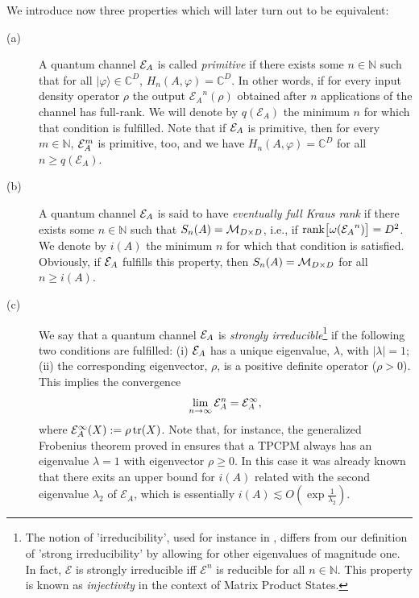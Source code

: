 \documentclass[journal,twoside]{IEEEtran}
\newcommand{\1}{\mathbbm{1}}
\def\E{{\cal E}}
\renewcommand{\>}{\rangle}
\newcommand{\<}{\langle}
\def\C{\mathbb{C}}
\def\E{\mathcal{E}}
\def\MDD{{\cal M}_{D\times D}}
\def\N{\mathbb N}
\begin{document}
We introduce now three properties which will later turn out to be
equivalent:
\begin{description}
  \item[(a)] A quantum channel  ${\cal E}_A$ is called {\em primitive} if
there exists some $n\in \N$ such that for all
$|\varphi\rangle\in \C^D$, $H_n(A,\varphi)=\C^D$. In other
words, if for every input density operator $\rho$ the output
${\E_A}^n(\rho)$ obtained after $n$ applications of the channel
has full-rank. We will denote by $q(\E_A)$ the minimum $n$ for
which that condition is fulfilled. Note that if ${\cal E}_A$ is
primitive, then for every $m\in\mathbb{N}$, ${\cal E}_A^m$ is
primitive, too, and  we have $H_n(A,\varphi)=\C^D$ for all $n\ge
q(\E_A)$.
  \item[(b)] A quantum channel ${\cal E}_A$ is said to have \emph{eventually
full Kraus rank} if there exists some $n\in \N$ such that
$S_n(A)=\MDD$, i.e., if ${\rm
rank}\big[\omega({\E_A}^n)\big]=D^2$. We denote by $i(A)$ the
minimum $n$ for which that condition is satisfied. Obviously, if
${\cal E}_A$ fulfills this property, then $S_n(A)=\MDD$ for all
$n\ge i(A)$.
  \item[(c)] We say that a quantum channel ${\cal E}_A$ is {\em strongly
irreducible}\footnote{The notion of 'irreducibility', used for
instance in \cite{gen-fro}, differs from our definition of
'strong irreducibility' by allowing for other eigenvalues of
magnitude one. In fact, $\E$ is strongly irreducible iff $\E^n$
is reducible for all $n\in\mathbb{N}$. This property is known as
\emph{injectivity} in the context of Matrix Product States.} if
the following two conditions are fulfilled: (i) ${\cal E}_A$ has
a unique eigenvalue, $\lambda$, with $|\lambda|=1$; (ii) the
corresponding eigenvector, $\rho$, is a  positive
definite operator ($\rho > 0$). This implies the convergence
 \begin{equation}
 \label{Einfty} \lim_{n\to\infty} {\cal E}_A^n = {\cal
 E}_A^\infty,
 \end{equation}
where ${\cal E}_A^\infty(X) := \rho \, {\rm tr}(X)$. Note that,
for instance, the generalized Frobenius theorem proved in
\cite[Theorem 2.5]{gen-fro} ensures that a TPCPM always has an
eigenvalue $\lambda=1$ with eigenvector $\rho\ge 0$. In this
case it was already known \cite[Lemma 5.2]{FNW92} that there
exits an upper bound for $i(A)$ related with the second
eigenvalue $\lambda_2$ of $\E_A$, which is essentially
$i(A)\lesssim O(\exp \frac{1}{\lambda_2})$.
\end{description}
\end{document}
